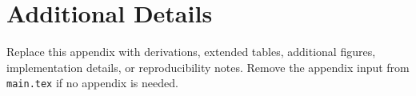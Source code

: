 \section{Additional Details}
\label{sec:appendix}

Replace this appendix with derivations, extended tables, additional figures, implementation details, or reproducibility notes. Remove the appendix input from \texttt{main.tex} if no appendix is needed.
